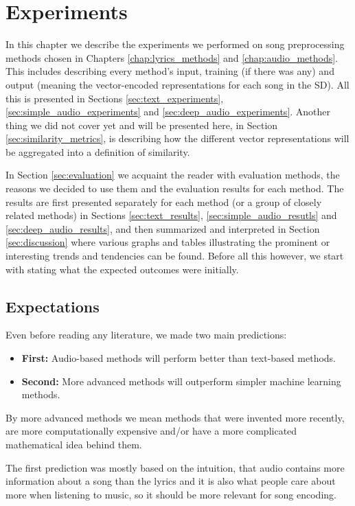 \chapter{Experiments}\label{chap:experiments}

In this chapter we describe the experiments we performed on song preprocessing methods chosen in Chapters \ref{chap:lyrics_methods} and \ref{chap:audio_methods}. This includes describing every method's input, training (if there was any) and output (meaning the vector-encoded representations for each song in the SD). All this is presented in Sections \ref{sec:text_experiments}, \ref{sec:simple_audio_experiments} and \ref{sec:deep_audio_experiments}. Another thing we did not cover yet and will be presented here, in Section \ref{sec:similarity_metrics}, is describing how the different vector representations will be aggregated into a definition of similarity.

In Section \ref{sec:evaluation} we acquaint the reader with evaluation methods, the reasons we decided to use them and the evaluation results for each method. The results are first presented separately for each method (or a group of closely related methods) in Sections \ref{sec:text_results}, \ref{sec:simple_audio_resutls} and \ref{sec:deep_audio_results}, and then summarized and interpreted in Section \ref{sec:discussion} where various graphs and tables illustrating the prominent or interesting trends and tendencies can be found. Before all this however, we start with stating what the expected outcomes were initially.

\section{Expectations}\label{sec:expectations}

Even before reading any literature, we made two main predictions: 
\begin{itemize}
    \item \textbf{First:} Audio-based methods will perform better than text-based methods.
    \item \textbf{Second:} More advanced methods will outperform simpler machine learning methods.
\end{itemize} 
By more advanced methods we mean methods that were invented more recently, are more computationally expensive and/or have a more complicated mathematical idea behind them. 

The first prediction was mostly based on the intuition, that audio contains more information about a song than the lyrics and it is also what people care about more when listening to music, so it should be more relevant for song encoding. 

